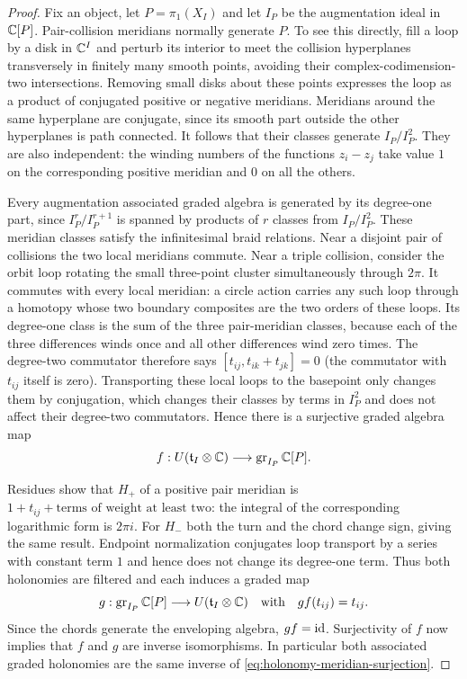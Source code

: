 \begin{proof}
Fix an object, let $P=\pi_1(X_I)$ and let $I_P$ be the augmentation
ideal in $\mathbb C[P]$.  Pair-collision meridians normally generate $P$.
To see this directly, fill a loop by a disk in $\mathbb C^I$ and perturb its
interior to meet the collision hyperplanes transversely in finitely
many smooth points, avoiding their complex-codimension-two
intersections.  Removing small disks about these points expresses the
loop as a product of conjugated positive or negative meridians.
Meridians around the same hyperplane are conjugate, since its smooth
part outside the other hyperplanes is path connected.  It follows
that their classes generate $I_P/I_P^2$.  They are also independent:
the winding numbers of the functions $z_i-z_j$ take value $1$ on the
corresponding positive meridian and $0$ on all the others.

Every augmentation associated graded algebra is generated by its
degree-one part, since $I_P^r/I_P^{r+1}$ is spanned by products of $r$
classes from $I_P/I_P^2$.  These meridian classes satisfy the
infinitesimal braid relations.  Near a disjoint pair of collisions
the two local meridians commute.  Near a triple collision, consider
the orbit loop rotating the small three-point cluster simultaneously
through $2\pi$.  It commutes with every local meridian: a circle
action carries any such loop through a homotopy whose two boundary
composites are the two orders of these loops.  Its degree-one class
is the sum of the three pair-meridian classes, because each of the
three differences winds once and all other differences wind zero
times.  The degree-two commutator therefore says
$[t_{ij},t_{ik}+t_{jk}]=0$ (the commutator with $t_{ij}$ itself is
zero).  Transporting these local loops to the basepoint only changes
them by conjugation, which changes their classes by terms in $I_P^2$
and does not affect their degree-two commutators.  Hence there is a
surjective graded algebra map
\begin{equation}\label{eq:holonomy-meridian-surjection}
 f:U(\mathfrak t_I\otimes\mathbb C)
 \longrightarrow\operatorname{gr}_{I_P}\mathbb C[P].
\end{equation}

Residues show that $H_+$ of a positive pair meridian is
$1+t_{ij}+\text{terms of weight at least two}$: the integral of the
corresponding logarithmic form is $2\pi i$.  For $H_-$ both the turn
and the chord change sign, giving the same result.  Endpoint
normalization conjugates loop transport by a series with constant
term $1$ and hence does not change its degree-one term.  Thus both
holonomies are filtered and each induces a graded map
\[
 g:\operatorname{gr}_{I_P}\mathbb C[P]
 \longrightarrow U(\mathfrak t_I\otimes\mathbb C)
 \quad\text{with}\quad g f(t_{ij})=t_{ij}.
\]
Since the chords generate the enveloping algebra, $gf=\mathrm{id}$.
Surjectivity of $f$ now implies that $f$ and $g$ are inverse
isomorphisms.  In particular both associated graded holonomies are
the same inverse of \eqref{eq:holonomy-meridian-surjection}.


\end{proof}
